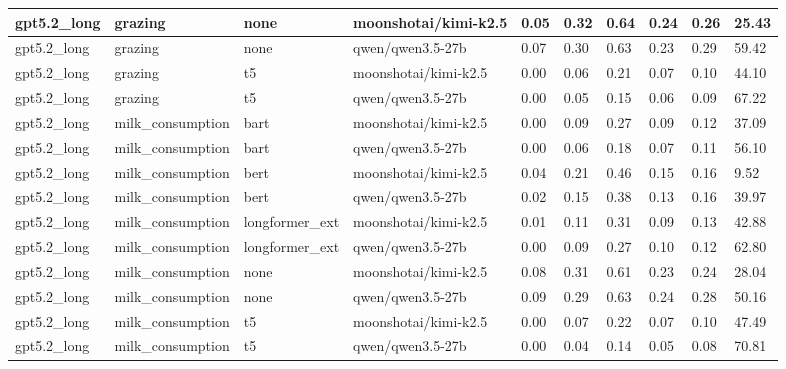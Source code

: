 \begin{tabular}{|l|l|l|l|l|l|l|l|l|l|}
 \hline
 gpt5.2\_long & grazing & none & moonshotai/kimi-k2.5 & 0.05 & 0.32 & 0.64 & 0.24 & 0.26 & 25.43 \\
 \hline
 gpt5.2\_long & grazing & none & qwen/qwen3.5-27b & 0.07 & 0.30 & 0.63 & 0.23 & 0.29 & 59.42 \\
 \hline
 gpt5.2\_long & grazing & t5 & moonshotai/kimi-k2.5 & 0.00 & 0.06 & 0.21 & 0.07 & 0.10 & 44.10 \\
 \hline
 gpt5.2\_long & grazing & t5 & qwen/qwen3.5-27b & 0.00 & 0.05 & 0.15 & 0.06 & 0.09 & 67.22 \\
 \hline
 gpt5.2\_long & milk\_consumption & bart & moonshotai/kimi-k2.5 & 0.00 & 0.09 & 0.27 & 0.09 & 0.12 & 37.09 \\
 \hline
 gpt5.2\_long & milk\_consumption & bart & qwen/qwen3.5-27b & 0.00 & 0.06 & 0.18 & 0.07 & 0.11 & 56.10 \\
 \hline
 gpt5.2\_long & milk\_consumption & bert & moonshotai/kimi-k2.5 & 0.04 & 0.21 & 0.46 & 0.15 & 0.16 & 9.52 \\
 \hline
 gpt5.2\_long & milk\_consumption & bert & qwen/qwen3.5-27b & 0.02 & 0.15 & 0.38 & 0.13 & 0.16 & 39.97 \\
 \hline
 gpt5.2\_long & milk\_consumption & longformer\_ext & moonshotai/kimi-k2.5 & 0.01 & 0.11 & 0.31 & 0.09 & 0.13 & 42.88 \\
 \hline
 gpt5.2\_long & milk\_consumption & longformer\_ext & qwen/qwen3.5-27b & 0.00 & 0.09 & 0.27 & 0.10 & 0.12 & 62.80 \\
 \hline
 gpt5.2\_long & milk\_consumption & none & moonshotai/kimi-k2.5 & 0.08 & 0.31 & 0.61 & 0.23 & 0.24 & 28.04 \\
 \hline
 gpt5.2\_long & milk\_consumption & none & qwen/qwen3.5-27b & 0.09 & 0.29 & 0.63 & 0.24 & 0.28 & 50.16 \\
 \hline
 gpt5.2\_long & milk\_consumption & t5 & moonshotai/kimi-k2.5 & 0.00 & 0.07 & 0.22 & 0.07 & 0.10 & 47.49 \\
 \hline
 gpt5.2\_long & milk\_consumption & t5 & qwen/qwen3.5-27b & 0.00 & 0.04 & 0.14 & 0.05 & 0.08 & 70.81 \\
\hline
\end{tabular}
